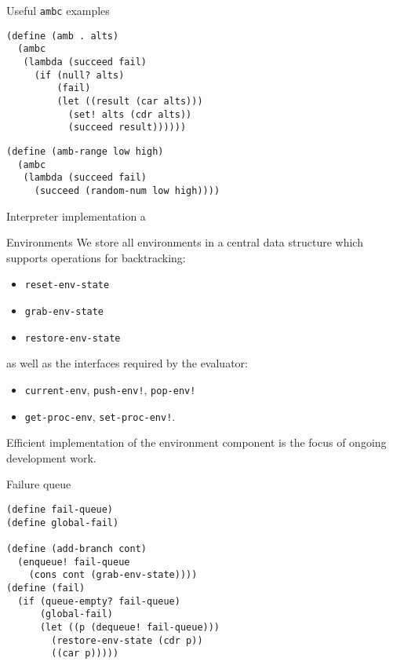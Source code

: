 \documentclass[14pt]{beamer}
\begin{document}
\begin{frame}[fragile]{Useful \texttt{ambc} examples}
  \begin{lstlisting}
(define (amb . alts)
  (ambc
   (lambda (succeed fail)
     (if (null? alts)
         (fail)
         (let ((result (car alts)))
           (set! alts (cdr alts))
           (succeed result))))))
  \end{lstlisting}
\pause
  \begin{lstlisting}
(define (amb-range low high)
  (ambc
   (lambda (succeed fail)
     (succeed (random-num low high))))
  \end{lstlisting}
\end{frame}

\begin{frame}{Interpreter implementation}
a
\end{frame}

\begin{frame}[fragile]{Environments}
  We store all environments in a central data structure which supports
  operations for backtracking:
  \begin{itemize}
  \item \texttt{reset-env-state}
  \item \texttt{grab-env-state}
  \item \texttt{restore-env-state}
  \end{itemize}
  as well as the interfaces required by the evaluator:
  \begin{itemize}
    \item \texttt{current-env}, \texttt{push-env!}, \texttt{pop-env!}
    \item \texttt{get-proc-env}, \texttt{set-proc-env!}.
  \end{itemize}
  \vfill Efficient implementation of the environment component is the
  focus of ongoing development work.
\end{frame}

\begin{frame}[fragile]{Failure queue}
  \begin{lstlisting}
(define fail-queue)
(define global-fail)

(define (add-branch cont)
  (enqueue! fail-queue
    (cons cont (grab-env-state))))
(define (fail)
  (if (queue-empty? fail-queue)
      (global-fail)
      (let ((p (dequeue! fail-queue)))
        (restore-env-state (cdr p))
        ((car p)))))
  \end{lstlisting}
\end{frame}
\end{document}
